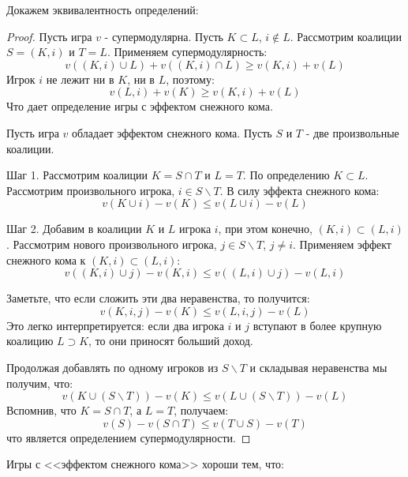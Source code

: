 Докажем эквивалентность определений:
\begin{proof}
Пусть игра $v$ - супермодулярна. Пусть $K\subset L$, $i\notin L$. Рассмотрим коалиции $S=(K,i)$ и $T=L$. Применяем супермодулярность:
\begin{equation}
v((K,i)\cup L)+v((K,i)\cap L)\geq v(K,i)+v(L)
\end{equation}
Игрок $i$ не лежит ни в $K$, ни в $L$, поэтому:
\begin{equation}
v(L,i)+v(K)\geq v(K,i)+v(L)
\end{equation}
Что дает определение игры с эффектом снежного кома.

Пусть игра $v$ обладает эффектом снежного кома. Пусть $S$ и $T$ - две произвольные коалиции. 

Шаг 1. Рассмотрим коалиции $K=S\cap T$ и $L=T$. По определению $K\subset L$. Рассмотрим произвольного игрока, $i\in S\backslash T$.
В силу эффекта снежного кома:
\begin{equation}
v(K\cup i)-v(K)\leq v(L\cup i)-v(L)
\end{equation}

Шаг 2. Добавим в коалиции $K$ и $L$ игрока $i$, при этом конечно, $(K,i)\subset (L,i)$. Рассмотрим нового произвольного игрока, $j\in S\backslash T$, $j\neq i$. Применяем эффект снежного кома к $(K,i)\subset (L,i)$:
\begin{equation}
v((K,i)\cup j)-v(K,i)\leq v((L,i)\cup j)-v(L,i)
\end{equation}

Заметьте, что если сложить эти два неравенства, то получится:
\begin{equation}
v(K,i,j)-v(K)\leq v(L,i,j)-v(L)
\end{equation}
Это легко интерпретируется: если два игрока $i$ и $j$ вступают в более крупную коалицию $L\supset K$, то они приносят больший доход.

Продолжая добавлять по одному игроков из $S\backslash T$ и складывая неравенства мы получим, что:
\begin{equation}
v(K\cup (S\backslash T))-v(K)\leq v(L\cup (S\backslash T))-v(L)
\end{equation}
Вспомнив, что $K=S\cap T$, а $L=T$, получаем:
\begin{equation}
v(S)-v(S\cap T)\leq v(T\cup S)-v(T)
\end{equation}
что является определением супермодулярности.
\end{proof}

Игры с <<эффектом снежного кома>> хороши тем, что:

